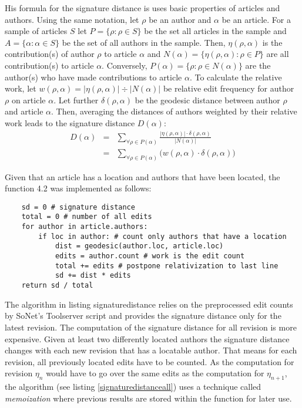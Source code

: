 His formula for the signature distance is uses basic properties of articles and authors.
Using the same notation, let $\rho$ be an author and $\alpha$ be an article.
For a sample of articles $S$ let $P = \{\rho : \rho \in S\}$ be the set all articles in the sample and $A = \{\alpha : \alpha \in S\}$ be the set of all authors in the sample.
Then, $\eta(\rho,\alpha)$ is the contribution(s) of author $\rho$ to article $\alpha$ and $N(\alpha) = \{\eta(\rho,\alpha) : \rho \in P\}$ are all contribution(s) to article $\alpha$.
Conversely, $P(\alpha) = \{\rho : \rho \in N(\alpha)\}$ are the author(s) who have made contributions to article $\alpha$.
To calculate the relative work, let $w(\rho,\alpha) = |\eta(\rho,\alpha)| \div |N(\alpha)|$ be relative edit frequency for author $\rho$ on article $\alpha$. 
Let further $\delta(\rho,\alpha)$ be the geodesic distance between author $\rho$ and article $\alpha$.
Then, averaging the distances of authors weighted by their relative work leads to the signature distance $D(\alpha)$:
\begin{eqnarray}
D(\alpha) & = & \sum_{\forall \rho \in P(\alpha)} \frac{|\eta(\rho,\alpha)| \cdot \delta(\rho,\alpha)}{|N(\alpha)|} \\
 & = &  \sum_{\forall \rho \in P(\alpha)} \big(w(\rho,\alpha) \cdot \delta(\rho,\alpha)\big)
\end{eqnarray}

Given that an article has a location and authors that have been located, the function 4.2 was implemented as follows:

\begin{lstlisting}
	sd = 0 # signature distance
	total = 0 # number of all edits
	for author in article.authors:
		if loc in author: # count only authors that have a location
			dist = geodesic(author.loc, article.loc)
			edits = author.count # work is the edit count
			total += edits # postpone relativization to last line 
			sd += dist * edits
	return sd / total
\end{lstlisting}

The algorithm in listing \refname{signaturedistance} relies on the preprocessed edit counts by SoNet's Toolserver script and provides the signature distance only for the latest revision. 
The computation of the signature distance for all revision is more expensive.
Given at least two differently located authors the signature distance changes with each new revision that has a locatable author.
That means for each revision, all previously located edits have to be counted.
As the computation for revision $\eta_{n}$ would have to go over the same edits as the computation for $\eta_{n+1}$, the algorithm (see listing \ref{signaturedistanceall}) uses a technique called \emph{memoization} where previous results are stored within the function for later use.

